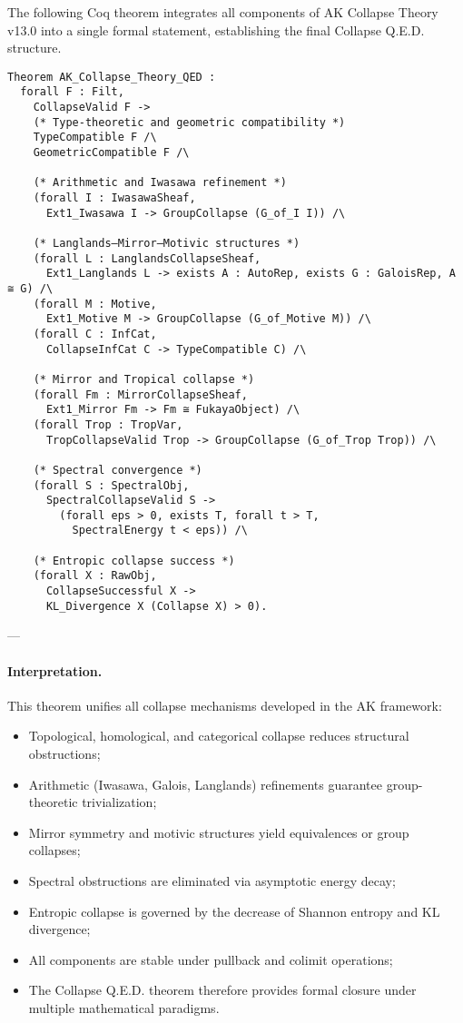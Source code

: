 \documentclass[11pt]{article}
\begin{document}
The following Coq theorem integrates all components of AK Collapse Theory v13.0 into a single formal statement, establishing the final Collapse Q.E.D. structure.

\begin{lstlisting}[language=Coq]
Theorem AK_Collapse_Theory_QED :
  forall F : Filt,
    CollapseValid F ->
    (* Type-theoretic and geometric compatibility *)
    TypeCompatible F /\
    GeometricCompatible F /\

    (* Arithmetic and Iwasawa refinement *)
    (forall I : IwasawaSheaf,
      Ext1_Iwasawa I -> GroupCollapse (G_of_I I)) /\

    (* Langlands–Mirror–Motivic structures *)
    (forall L : LanglandsCollapseSheaf,
      Ext1_Langlands L -> exists A : AutoRep, exists G : GaloisRep, A ≅ G) /\
    (forall M : Motive,
      Ext1_Motive M -> GroupCollapse (G_of_Motive M)) /\
    (forall C : InfCat,
      CollapseInfCat C -> TypeCompatible C) /\

    (* Mirror and Tropical collapse *)
    (forall Fm : MirrorCollapseSheaf,
      Ext1_Mirror Fm -> Fm ≅ FukayaObject) /\
    (forall Trop : TropVar,
      TropCollapseValid Trop -> GroupCollapse (G_of_Trop Trop)) /\

    (* Spectral convergence *)
    (forall S : SpectralObj,
      SpectralCollapseValid S ->
        (forall eps > 0, exists T, forall t > T,
          SpectralEnergy t < eps)) /\

    (* Entropic collapse success *)
    (forall X : RawObj,
      CollapseSuccessful X ->
      KL_Divergence X (Collapse X) > 0).
\end{lstlisting}


---

\paragraph{Interpretation.}
This theorem unifies all collapse mechanisms developed in the AK framework:

\begin{itemize}
    \item Topological, homological, and categorical collapse reduces structural obstructions;
    \item Arithmetic (Iwasawa, Galois, Langlands) refinements guarantee group-theoretic trivialization;
    \item Mirror symmetry and motivic structures yield equivalences or group collapses;
    \item Spectral obstructions are eliminated via asymptotic energy decay;
    \item Entropic collapse is governed by the decrease of Shannon entropy and KL divergence;
    \item All components are stable under pullback and colimit operations;
    \item The Collapse Q.E.D. theorem therefore provides formal closure under multiple mathematical paradigms.
\end{itemize}
\end{document}
